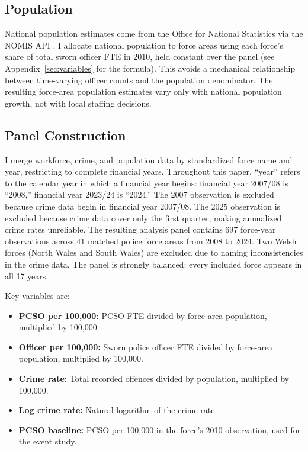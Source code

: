 \documentclass[12pt]{article}
\begin{document}
\subsection{Population}

National population estimates come from the Office for National Statistics via the NOMIS API \citep{ons2025pop}. I allocate national population to force areas using each force's share of total sworn officer FTE in 2010, held constant over the panel (see Appendix~\ref{sec:variables} for the formula). This avoids a mechanical relationship between time-varying officer counts and the population denominator. The resulting force-area population estimates vary only with national population growth, not with local staffing decisions.

\subsection{Panel Construction}\label{sec:panel}

I merge workforce, crime, and population data by standardized force name and year, restricting to complete financial years. Throughout this paper, ``year'' refers to the calendar year in which a financial year begins: financial year 2007/08 is ``2008,'' financial year 2023/24 is ``2024.'' The 2007 observation is excluded because crime data begin in financial year 2007/08. The 2025 observation is excluded because crime data cover only the first quarter, making annualized crime rates unreliable. The resulting analysis panel contains 697 force-year observations across 41 matched police force areas from 2008 to 2024. Two Welsh forces (North Wales and South Wales) are excluded due to naming inconsistencies in the crime data. The panel is strongly balanced: every included force appears in all 17 years.

Key variables are:
\begin{itemize}
    \item \textbf{PCSO per 100,000:} PCSO FTE divided by force-area population, multiplied by 100,000.
    \item \textbf{Officer per 100,000:} Sworn police officer FTE divided by force-area population, multiplied by 100,000.
    \item \textbf{Crime rate:} Total recorded offences divided by population, multiplied by 100,000.
    \item \textbf{Log crime rate:} Natural logarithm of the crime rate.
    \item \textbf{PCSO baseline:} PCSO per 100,000 in the force's 2010 observation, used for the event study.
\end{itemize}
\end{document}

